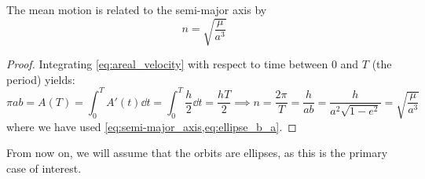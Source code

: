 \documentclass[../main.tex]{subfiles}
\begin{document}
\begin{proposition}\label{prop:kepler_third_law}
  The mean motion is related to the semi-major axis by
  \begin{equation}
    n=\sqrt{\frac{\mu}{a^3}}
  \end{equation}
\end{proposition}
\begin{proof}
  Integrating \cref{eq:areal_velocity} with respect to time between 0 and $T$ (the period) yields:
  \begin{equation}
    \pi a b=A(T)=\int_0^T A'(t)\dd{t}=\int_0^T \frac{h}{2}\dd{t}=\frac{hT}{2}\implies n=\frac{2\pi}{T}=\frac{h}{a b}=\frac{h}{a^2\sqrt{1-e^2}}=\sqrt{\frac{\mu}{a^3}}
  \end{equation}
  where we have used \cref{eq:semi-major_axis,eq:ellipse_b_a}.
\end{proof}
From now on, we will assume that the orbits are ellipses, as this is the primary case of interest.
\end{document}
